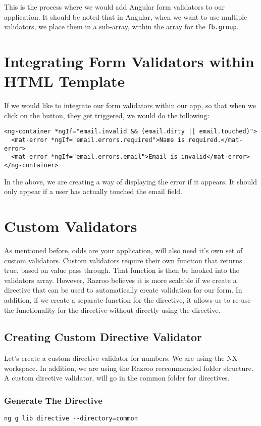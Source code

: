 This is the process where we would add Angular form validators to our application. It should be noted that in Angular, when we want to use multiple validators, we place them in a sub-array, within the array for the \lstinline{fb.group}.

\section{Integrating Form Validators within HTML Template}
If we would like to integrate our form validators within our app, so that when 
we click on the button, they get triggered, we would do the following:

\begin{lstlisting}[caption=Integrate Form Validation with HTML]
<ng-container *ngIf="email.invalid && (email.dirty || email.touched)">
  <mat-error *ngIf="email.errors.required">Name is required.</mat-error>
  <mat-error *ngIf="email.errors.email">Email is invalid</mat-error>
</ng-container>
\end{lstlisting}

In the above, we are creating a way of displaying the error if it appears. It should only appear if a user has actually touched the email field. 

\section{Custom Validators}
As mentioned before, odds are your application, will also need it's own set of custom validators. Custom validators require their own function that returns true, based on value pass through. That function is then be hooked into the validators array. However, Razroo believes it is more scalable if we create a directive that can be used to automatically create validation for our form. In addition, if we create a separate function for the directive, it allows us to re-use the functionality for the directive without directly using the directive.

\subsection{Creating Custom Directive Validator}
Let's create a custom directive validator for numbers. We are using the NX workspace. In addition, we are using the Razroo reccommended folder structure. A custom directive validator, will go in the common folder for directives. 

\subsubsection{Generate The Directive}
\begin{verbatim}
ng g lib directive --directory=common  
\end{verbatim}

